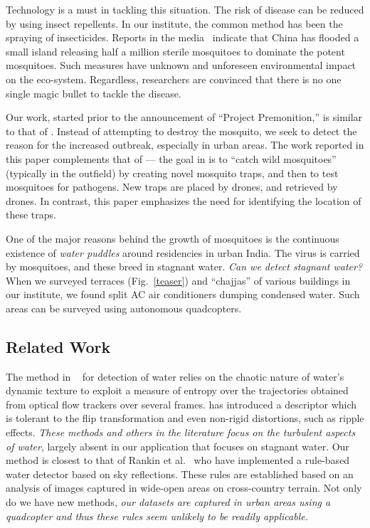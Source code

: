 \documentclass[11pt]{article}
\begin{document}
Technology is a must in tackling this situation.  The risk of disease
can be reduced by using insect repellents. In our institute, the
common method has been the spraying of insecticides.  Reports in the
media~\cite{china} indicate that China has flooded a small island
releasing half a million sterile mosquitoes to dominate the potent
mosquitoes. Such measures have unknown and unforeseen environmental
impact on the eco-system. Regardless, researchers are convinced that
there is no one single magic bullet to tackle the disease. 

Our work, started prior to the announcement of ``Project
Premonition,'' is similar to that of \cite{Microsoft15}.  Instead of
attempting to destroy the mosquito, we seek to detect the reason for
the increased outbreak, especially in urban areas.  The work reported
in this paper complements that of \cite{Microsoft15} --- the goal in \cite{Microsoft15}
is to ``catch wild mosquitoes'' (typically in the outfield) by
creating novel mosquito traps, and then to test mosquitoes for
pathogens. New traps are placed by drones, and retrieved by drones.
In contrast, this paper emphasizes the need for identifying the
location of these traps.  

One of the major reasons behind the growth of mosquitoes is the
continuous existence of \emph{water puddles} around residencies in
urban India.  The virus is carried by mosquitoes, and these breed in
stagnant water. \emph{Can we detect stagnant water?}  When we surveyed
terraces (Fig.~\ref{teaser}) and ``chajjas'' of various buildings in
our institute, we found split AC air conditioners dumping condensed
water. Such areas can be surveyed using autonomous quadcopters.

\subsection{Related Work}
The method in ~\cite{santana12} for detection of
water relies on the chaotic nature of water's dynamic texture to
exploit a measure of entropy over the trajectories obtained from
optical flow trackers over several frames. \cite{zhang10} has
introduced a descriptor which is tolerant to the flip transformation
and even non-rigid distortions, such as ripple effects.  \emph{These
  methods and others in the literature focus on the turbulent aspects
  of water}, largely absent in our application that focuses on
stagnant water.  Our method is closest to that of Rankin et
al.~\cite{rankin2004daytime, rankin11} who have implemented a rule-based water
detector based on sky reflections.  These rules are established
based on an analysis of images captured in wide-open areas on
cross-country terrain. Not only do we have new methods, \emph{our
datasets are captured in urban areas using a quadcopter and thus these
rules seem unlikely to be readily applicable.}
\end{document}
